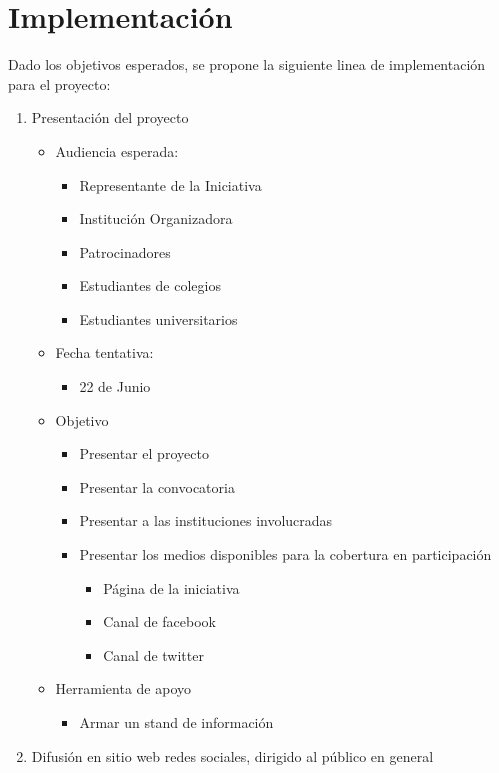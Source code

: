 \documentclass{article}
\begin{document}
\section{Implementación}

Dado los objetivos esperados, se propone la siguiente linea de implementación para el proyecto:

\begin{enumerate}
\item Presentación del proyecto
\begin{itemize}
\item Audiencia esperada:
\begin{itemize}
\item Representante de la Iniciativa
\item Institución Organizadora
\item Patrocinadores
\item Estudiantes de colegios
\item Estudiantes universitarios
\end{itemize}
\item Fecha tentativa:
\begin{itemize}
\item 22 de Junio
\end{itemize}
\item Objetivo
\begin{itemize}
\item Presentar el proyecto
\item Presentar la convocatoria
\item Presentar a las instituciones involucradas
\item Presentar los medios disponibles para la cobertura en participación
\begin{itemize}
\item Página de la iniciativa 
\item Canal de facebook
\item Canal de twitter
\end{itemize}
\end{itemize}
\item Herramienta de apoyo
\begin{itemize}
\item Armar un stand de información
\end{itemize}
\end{itemize}
\item Difusión en sitio web redes sociales, dirigido al público en general 
\begin{itemize}

\end{itemize}
\end{enumerate}
\end{document}
